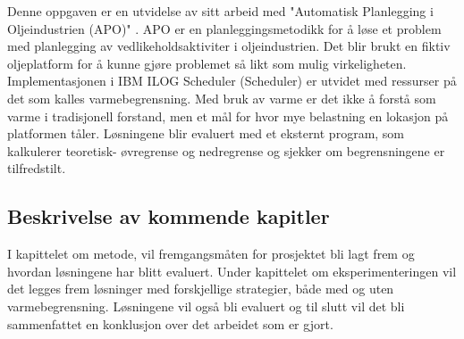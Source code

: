 Denne oppgaven er en utvidelse av \bht sitt arbeid med "Automatisk Planlegging i Oljeindustrien (APO)" \cite{tvedtbezem}. APO er en planleggingsmetodikk for å løse et problem med planlegging av vedlikeholdsaktiviter i oljeindustrien. Det blir brukt en fiktiv oljeplatform for å kunne gjøre problemet så likt som mulig virkeligheten. Implementasjonen i IBM ILOG Scheduler (Scheduler) er utvidet med ressurser på det som kalles varmebegrensning. Med bruk av varme er det ikke å forstå som varme i tradisjonell forstand, men et mål for hvor mye belastning en lokasjon på platformen tåler. Løsningene blir evaluert med et eksternt program, som kalkulerer teoretisk- øvregrense og nedregrense og sjekker om begrensningene er tilfredstilt.

\subsection{Beskrivelse av kommende kapitler}
I kapittelet om metode, vil fremgangsmåten for prosjektet bli lagt frem og hvordan løsningene har blitt evaluert. Under kapittelet om eksperimenteringen vil det legges frem løsninger med forskjellige strategier, både med og uten varmebegrensning. Løsningene vil også bli evaluert og til slutt vil det bli sammenfattet en konklusjon over det arbeidet som er gjort.